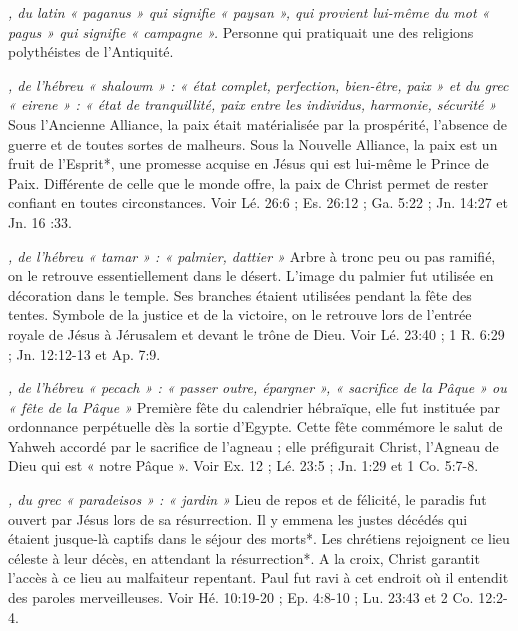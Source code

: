 \begin{multicols}{2}
{\textit{, du latin « paganus » qui signifie « paysan », qui provient lui-même du mot « pagus » qui signifie « campagne ».}\newline
Personne qui pratiquait une des religions polythéistes de l'Antiquité.

\textit{, de l'hébreu « shalowm » : « état complet, perfection, bien-être, paix » et du grec « eirene » : « état de tranquillité, paix entre les individus, harmonie, sécurité »}\newline
Sous l'Ancienne Alliance, la paix était matérialisée par la prospérité, l'absence de guerre et de toutes sortes de malheurs. Sous la Nouvelle Alliance, la paix est un fruit de l'Esprit*, une promesse acquise en Jésus qui est lui-même le Prince de Paix. Différente de celle que le monde offre, la paix de Christ permet de rester confiant en toutes circonstances. Voir Lé. 26:6 ; Es. 26:12 ; Ga. 5:22 ; Jn. 14:27 et Jn. 16 :33.

\textit{, de l'hébreu « tamar » : « palmier, dattier »}\newline
Arbre à tronc peu ou pas ramifié, on le retrouve essentiellement dans le désert. L'image du palmier fut utilisée en décoration dans le temple. Ses branches étaient utilisées pendant la fête des tentes. Symbole de la justice et de la victoire, on le retrouve lors de l'entrée royale de Jésus à Jérusalem et devant le trône de Dieu. Voir Lé. 23:40 ; 1 R. 6:29 ; Jn. 12:12-13 et Ap. 7:9.

\textit{, de l'hébreu « pecach » : « passer outre, épargner », « sacrifice de la Pâque » ou « fête de la Pâque »}\newline
Première fête du calendrier hébraïque, elle fut instituée par ordonnance perpétuelle dès la sortie d'Egypte. Cette fête commémore le salut de Yahweh accordé par le sacrifice de l'agneau ; elle préfigurait Christ, l'Agneau de Dieu qui est « notre Pâque ». Voir Ex. 12 ; Lé. 23:5 ; Jn. 1:29 et 1 Co. 5:7-8.

\textit{, du grec « paradeisos » : « jardin »}\newline
Lieu de repos et de félicité, le paradis fut ouvert par Jésus lors de sa résurrection. Il y emmena les justes décédés qui étaient jusque-là captifs dans le séjour des morts*. Les chrétiens rejoignent ce lieu céleste à leur décès, en attendant la résurrection*. A la croix, Christ garantit l'accès à ce lieu au malfaiteur repentant. Paul fut ravi à cet endroit où il entendit des paroles merveilleuses. Voir Hé. 10:19-20 ; Ep. 4:8-10 ; Lu. 23:43 et 2 Co. 12:2-4.

}
\end{multicols}
